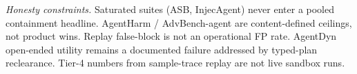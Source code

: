 \documentclass[11pt]{article}
\begin{document}
\noindent\textit{Honesty constraints.} Saturated suites (ASB, InjecAgent) never enter a
pooled containment headline. AgentHarm / AdvBench-agent are content-defined
ceilings, not product wins. Replay false-block is not an operational FP rate.
AgentDyn open-ended utility remains a documented failure addressed by typed-plan
reclearance. Tier-4 numbers from sample-trace replay are not live sandbox runs.
\end{document}
